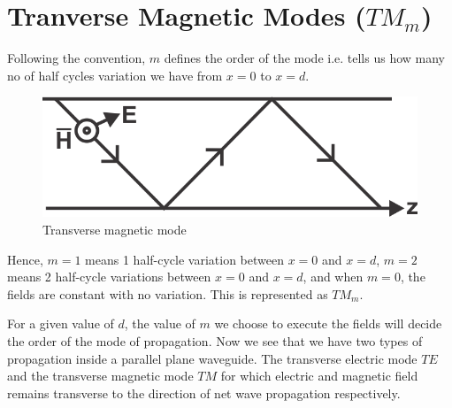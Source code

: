 \section{Tranverse Magnetic  Modes ($TM_m$)}
 Following the convention, $m$ defines the order of the mode i.e. tells us how many no of half cycles variation we have from $x = 0$ to $x = d$.
\begin{figure}[h]
\centering
\includegraphics[scale=1]{./graphics/silas3}
\caption{Transverse magnetic  mode}
\end{figure}
Hence, $ m = 1$ means 1 half-cycle variation between $x = 0$ and $x = d$, $m = 2$ means 2 half-cycle variations between $x = 0$ and $x = d$, and when $m = 0$, the fields are constant with no variation. This is represented as $TM_m$. 

For a given value of $d$, the value of $m$ we choose to execute the fields will decide the order of the mode of propagation. Now we see that we have two types of propagation inside a parallel plane waveguide. The transverse electric mode $TE$ and the transverse magnetic mode $TM$ for which electric and magnetic field remains transverse to the direction of net wave propagation respectively. 


